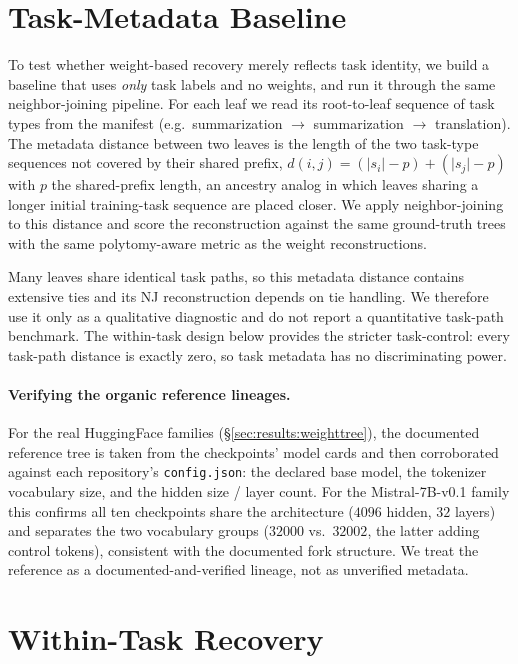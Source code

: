\documentclass{article}
\theoremstyle{definition}
\theoremstyle{plain}
\begin{document}
\section{Task-Metadata Baseline}
\label{app:taskbaseline}

To test whether weight-based recovery merely reflects task identity, we build a baseline that uses
\emph{only} task labels and no weights, and run it through the same neighbor-joining pipeline. For each
leaf we read its root-to-leaf sequence of task types from the manifest (e.g.\ summarization $\to$
summarization $\to$ translation). The metadata distance between two leaves is the length of the two
task-type sequences not covered by their shared prefix, $d(i,j)=(\lvert s_i\rvert-p)+(\lvert
s_j\rvert-p)$ with $p$ the shared-prefix length, an ancestry analog in which leaves sharing a longer
initial training-task sequence are placed closer. We apply neighbor-joining to this distance and score
the reconstruction against the same ground-truth trees with the same polytomy-aware metric as the
weight reconstructions.

Many leaves share identical task paths, so this metadata distance contains extensive ties and its NJ
reconstruction depends on tie handling. We therefore use it only as a qualitative diagnostic and do
not report a quantitative task-path benchmark. The within-task design below provides the stricter
task-control: every task-path distance is exactly zero, so task metadata has no discriminating power.

\paragraph{Verifying the organic reference lineages.} For the real HuggingFace families
(\S\ref{sec:results:weighttree}), the documented reference tree is taken from the checkpoints' model cards and
then corroborated against each repository's \texttt{config.json}: the declared base model, the tokenizer
vocabulary size, and the hidden size / layer count. For the Mistral-7B-v0.1 family this confirms all ten
checkpoints share the architecture ($4096$ hidden, $32$ layers) and separates the two vocabulary groups
($32000$ vs.\ $32002$, the latter adding control tokens), consistent with the documented fork structure.
We treat the reference as a documented-and-verified lineage, not as unverified metadata.


\section{Within-Task Recovery}
\label{app:withintask}
\end{document}
